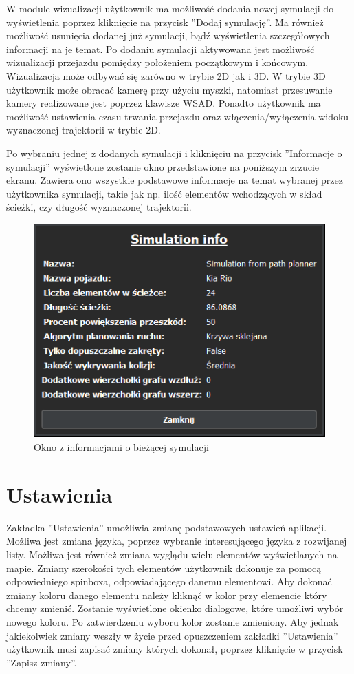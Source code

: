 \documentclass[a4paper,11pt,twoside]{report}
\theoremstyle{definition}
\begin{document}
W module wizualizacji użytkownik ma możliwość dodania nowej symulacji do wyświetlenia poprzez kliknięcie na przycisk ''Dodaj symulację''. Ma również możliwość usunięcia dodanej już symulacji, bądź wyświetlenia szczegółowych informacji na je temat. Po dodaniu symulacji aktywowana jest możliwość wizualizacji przejazdu pomiędzy położeniem początkowym i końcowym. Wizualizacja może odbywać się zarówno w trybie 2D jak i 3D. W trybie 3D użytkownik może obracać kamerę przy użyciu myszki, natomiast przesuwanie kamery realizowane jest poprzez klawisze WSAD. Ponadto użytkownik ma możliwość ustawienia czasu trwania przejazdu oraz włączenia/wyłączenia widoku wyznaczonej trajektorii w trybie 2D.

Po wybraniu jednej z dodanych symulacji i kliknięciu na przycisk ''Informacje o symulacji'' wyświetlone zostanie okno przedstawione na poniższym zrzucie ekranu. Zawiera ono wszystkie podstawowe informacje na temat wybranej przez użytkownika symulacji, takie jak np. ilość elementów wchodzących w skład ścieżki, czy długość wyznaczonej trajektorii.

\begin{figure}[h!]
\centering
\includegraphics[scale=1.0]{instructionSimulationInfo}
\caption[Okno z informacjami o bieżącej symulacji]{Okno z informacjami o bieżącej symulacji}
\end{figure}

\section{Ustawienia}

Zakładka ''Ustawienia'' umożliwia zmianę podstawowych ustawień aplikacji. Możliwa jest zmiana języka, poprzez wybranie interesującego języka z rozwijanej listy. Możliwa jest również zmiana wyglądu wielu elementów wyświetlanych na mapie. Zmiany szerokości tych elementów użytkownik dokonuje za pomocą odpowiedniego spinboxa, odpowiadającego danemu elementowi. Aby dokonać zmiany koloru danego elementu należy kliknąć w kolor przy elemencie który chcemy zmienić. Zostanie wyświetlone okienko dialogowe, które umożliwi wybór nowego koloru. Po zatwierdzeniu wyboru kolor zostanie zmieniony. Aby jednak jakiekolwiek zmiany weszły w życie przed opuszczeniem zakładki ''Ustawienia'' użytkownik musi zapisać zmiany których dokonał, poprzez kliknięcie w przycisk ''Zapisz zmiany''. 
\end{document}
